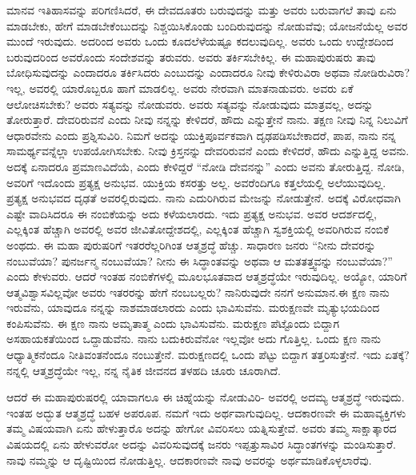 ಮಾನವ ಇತಿಹಾಸವನ್ನು ಪರಿಗಣಿಸಿದರೆ, ಈ ದೇವದೂತರು ಬರುವುದನ್ನು ಮತ್ತು ಅವರು ಬರುವಾಗಲೆ ತಾವು ಏನು ಮಾಡಬೇಕು, ಹೇಗೆ ಮಾಡಬೇಕೆಂಬುದನ್ನು ನಿಶ್ಚಯಿಸಿ\-ಕೊಂಡು ಬಂದಿರುವುದನ್ನು ನೋಡುವೆವು; ಯೋಜನೆಯೆಲ್ಲ ಅವರ ಮುಂದೆ ಇರುವುದು. ಅದರಿಂದ ಅವರು ಒಂದು ಕೂದಲೆಳೆಯಷ್ಟೂ ಕದಲುವುದಿಲ್ಲ. ಅವರು ಒಂದು ಉದ್ದೇಶದಿಂದ ಬರುವುದರಿಂದ ಅವರೊಂದು ಸಂದೇಶವನ್ನು ತರುವರು. ಅವರು ತರ್ಕಿಸಬೇಕಿಲ್ಲ. ಈ ಮಹಾಪುರುಷರು ತಾವು ಬೋಧಿಸುವುದನ್ನು ಎಂದಾದರೂ ತರ್ಕಿಸಿದರು ಎಂಬುದನ್ನು ಎಂದಾದರೂ ನೀವು ಕೇಳಿರುವಿರಾ ಅಥವಾ ನೋಡಿರುವಿರಾ? ಇಲ್ಲ, ಅವರಲ್ಲಿ ಯಾರೊಬ್ಬರೂ ಹಾಗೆ ಮಾಡಲಿಲ್ಲ. ಅವರು ನೇರವಾಗಿ ಮಾತನಾಡುವರು. ಅವರು ಏಕೆ ಆಲೋಚಿಸಬೇಕು? ಅವರು ಸತ್ಯವನ್ನು ನೋಡುವರು. ಅವರು ಸತ್ಯವನ್ನು ನೋಡುವುದು ಮಾತ್ರವಲ್ಲ, ಅದನ್ನು ತೋರುತ್ತಾರೆ. ದೇವರಿರುವನೆ ಎಂದು ನೀವು ನನ್ನನ್ನು ಕೇಳಿದರೆ, ಹೌದು ಎನ್ನುತ್ತೇನೆ ನಾನು. ತಕ್ಷಣ ನೀವು ನಿನ್ನ ನಿಲುವಿಗೆ ಆಧಾರವೇನು ಎಂದು ಪ್ರಶ್ನಿಸುವಿರಿ. ನಿಮಗೆ ಅದನ್ನು ಯುಕ್ತಿಪೂರ್ವಕವಾಗಿ ದೃಢಪಡಿಸಬೇಕಾದರೆ, ಪಾಪ, ನಾನು ನನ್ನ ಸಾಮರ್ಥ್ಯವನ್ನೆಲ್ಲಾ ಉಪಯೋಗಿಸಬೇಕು. ನೀವು ಕ್ರಿಸ್ತನನ್ನು ದೇವರಿರುವನೆ ಎಂದು ಕೇಳಿದರೆ, ಹೌದು ಎನ್ನುತ್ತಿದ್ದ ಅವನು. ಅದಕ್ಕೆ ಏನಾದರೂ ಪ್ರಮಾಣವಿದೆಯೆ, ಎಂದು ಕೇಳಿದ್ದರೆ “ನೋಡಿ ದೇವನನ್ನು” ಎಂದು ಅವನು ತೋರುತ್ತಿದ್ದ. ನೋಡಿ, ಅವರಿಗೆ ಇದೊಂದು ಪ್ರತ್ಯಕ್ಷ ಅನುಭವ. ಯುಕ್ತಿಯ ಕಸರತ್ತು ಅಲ್ಲ. ಅವರೆಂದಿಗೂ ಕತ್ತಲೆಯಲ್ಲಿ ಅಲೆಯುವುದಿಲ್ಲ. ಪ್ರತ್ಯಕ್ಷ ಅನುಭವದ ದೃಢತೆ ಅವರಲ್ಲಿರುವುದು. ನಾನು ಎದುರಿಗಿರುವ ಮೇಜನ್ನು ನೋಡುತ್ತೇನೆ. ಅದಕ್ಕೆ ವಿರೋಧವಾಗಿ ಎಷ್ಟೇ ವಾದಿಸಿದರೂ ಈ ನಂಬಿಕೆಯನ್ನು ಅದು ಕಳೆಯಲಾರದು. ಇದು ಪ್ರತ್ಯಕ್ಷ ಅನುಭವ. ಅವರ ಆದರ್ಶದಲ್ಲಿ, ಎಲ್ಲಕ್ಕಿಂತ ಹೆಚ್ಚಾಗಿ ಅವರಲ್ಲಿ ಅವರ ಜೀವಿತೋದ್ದೇಶದಲ್ಲಿ, ಎಲ್ಲಕ್ಕಿಂತ ಹೆಚ್ಚಾಗಿ ಸ್ವಶಕ್ತಿಯಲ್ಲಿ ಅವರಿಗಿರುವ ನಂಬಿಕೆ ಅಂಥದು. ಈ ಮಹಾ ಪುರುಷರಿಗೆ ಇತರರೆಲ್ಲರಿಗಿಂತ ಆತ್ಮಶ್ರದ್ಧೆ ಹೆಚ್ಚು. ಸಾಧಾರಣ ಜನರು “ನೀನು ದೇವರನ್ನು ನಂಬುವೆಯಾ? ಪುನರ್ಜನ್ಮ ನಂಬುವೆಯಾ? ನೀನು ಈ ಸಿದ್ಧಾಂತವನ್ನು ಅಥವಾ ಆ ಮತತತ್ತ್ವವನ್ನು ನಂಬುವೆಯಾ?” ಎಂದು ಕೇಳುವರು. ಆದರೆ ಇಂತಹ ನಂಬಿಕೆಗಳಲ್ಲಿ ಮೂಲಭೂತವಾದ ಆತ್ಮಶ್ರದ್ಧೆಯೇ ಇರುವುದಿಲ್ಲ. ಅಯ್ಯೋ, ಯಾರಿಗೆ ಆತ್ಮವಿಶ್ವಾಸವಿಲ್ಲವೋ ಅವರು ಇತರರನ್ನು ಹೇಗೆ ನಂಬಬಲ್ಲರು? ನಾನಿರುವುದೇ ನನಗೆ ಅನುಮಾನ.\break ಈ ಕ್ಷಣ ನಾನು ಇರುವೆನು, ಯಾವುದೂ ನನ್ನನ್ನು ನಾಶಮಾಡಲಾರದು ಎಂದು ಭಾವಿಸುವೆನು. ಮರುಕ್ಷಣವೇ ಮೃತ್ಯುಭಯದಿಂದ ಕಂಪಿಸುವೆನು. ಈ ಕ್ಷಣ ನಾನು ಅಮೃತಾತ್ಮ ಎಂದು ಭಾವಿಸುವೆನು. ಮರುಕ್ಷಣ ಪೆಟ್ಟೊಂದು ಬಿದ್ದಾಗ ಅಸಹಾಯಕತೆಯಿಂದ ಒದ್ದಾಡುವೆನು. ನಾನು ಬದುಕಿರುವೆನೋ ಇಲ್ಲವೋ ಅದು ಗೊತ್ತಿಲ್ಲ. ಒಂದು ಕ್ಷಣ ನಾನು ಆಧ್ಯಾತ್ಮಿಕನೆಂದೂ ನೀತಿವಂತನೆಂದೂ ನಂಬುತ್ತೇನೆ. ಮರುಕ್ಷಣದಲ್ಲಿ ಒಂದು ಪೆಟ್ಟು ಬಿದ್ದಾಗ ತತ್ತರಿಸುತ್ತೇನೆ. ಇದು ಏತಕ್ಕೆ? ನನ್ನಲ್ಲಿ ಆತ್ಮಶ್ರದ್ಧೆಯೇ ಇಲ್ಲ, ನನ್ನ ನೈತಿಕ ಜೀವನದ ತಳಹದಿ ಚೂರು ಚೂರಾಗಿದೆ.

ಆದರೆ ಈ ಮಹಾಪುರುಷರಲ್ಲಿ ಯಾವಾಗಲೂ ಈ ಚಿಹ್ನೆಯನ್ನು ನೋಡುವಿರಿ- ಅವರಲ್ಲಿ ಅದಮ್ಯ ಆತ್ಮಶ್ರದ್ಧೆ ಇರುವುದು. ಇಂತಹ ಅದ್ಭುತ ಆತ್ಮಶ್ರದ್ಧೆ ಬಹಳ ಅಪರೂಪ. ನಮಗೆ ಇದು ಅರ್ಥವಾಗುವುದಿಲ್ಲ. ಆದಕಾರಣವೇ ಈ ಮಹಾವ್ಯಕ್ತಿಗಳು ತಮ್ಮ ವಿಷಯವಾಗಿ ಏನು ಹೇಳುತ್ತಾರೊ ಅದನ್ನು ಹೇಗೋ ವಿವರಿಸಲು ಯತ್ನಿಸುತ್ತೇವೆ. ಅವರು ತಮ್ಮ ಸಾಕ್ಷಾತ್ಕಾರದ ವಿಷಯದಲ್ಲಿ ಏನು ಹೇಳುವರೋ ಅದನ್ನು ವಿವರಿಸುವುದಕ್ಕೆ ಜನರು ಇಪ್ಪತ್ತುಸಾವಿರ ಸಿದ್ಧಾಂತಗಳನ್ನು ಮಂಡಿಸುತ್ತಾರೆ. ನಾವು ನಮ್ಮನ್ನು ಆ ದೃಷ್ಟಿಯಿಂದ ನೋಡುತ್ತಿಲ್ಲ. ಆದಕಾರಣವೇ ನಾವು ಅವರನ್ನು ಅರ್ಥಮಾಡಿಕೊಳ್ಳಲಾರೆವು.

